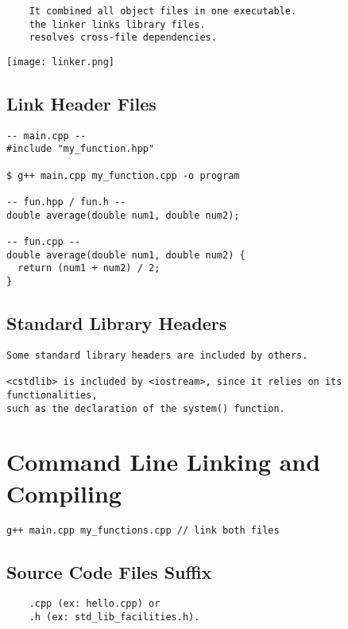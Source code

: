 \documentclass[openany]{report}
\begin{document}
\begin{verbatim}
    It combined all object files in one executable.
    the linker links library files. 
    resolves cross-file dependencies.  
\end{verbatim}

\begin{center}
\texttt{[image: linker.png]}
\end{center}

\subsection{Link Header Files}

\begin{verbatim}
-- main.cpp --
#include "my_function.hpp"

$ g++ main.cpp my_function.cpp -o program

-- fun.hpp / fun.h --
double average(double num1, double num2);

-- fun.cpp --
double average(double num1, double num2) {
  return (num1 + num2) / 2;
}
\end{verbatim}

\subsection{Standard Library Headers}

\begin{verbatim}
Some standard library headers are included by others. 

<cstdlib> is included by <iostream>, since it relies on its functionalities,
such as the declaration of the system() function. 
\end{verbatim}

\section{Command Line Linking and Compiling}

\begin{verbatim}
g++ main.cpp my_functions.cpp // link both files
\end{verbatim}

\subsection{Source Code Files Suffix}

\begin{verbatim}
    .cpp (ex: hello.cpp) or
    .h (ex: std_lib_facilities.h).
\end{verbatim}
\end{document}
